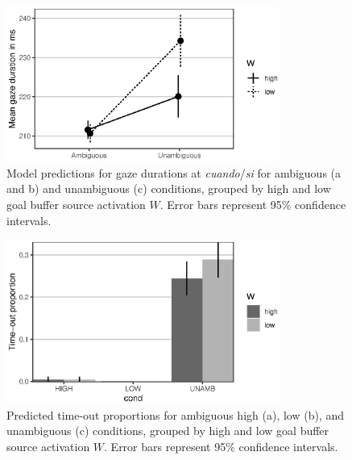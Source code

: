 \documentclass{cambridge7A}\usepackage[]{graphicx}\usepackage[]{color}
\newenvironment{knitrout}{}{} %
\begin{document}
\begin{figure}[!htbp]
\centering
\begin{knitrout}
\color{fgcolor}

{\centering \includegraphics[width=0.8\textwidth]{figures/fig-mv13modelambadv-1} 

}



\end{knitrout}
  \caption[Predicted gaze durations by source activation at ambiguous and unambiguous attachments.]{Model predictions for gaze durations at \textit{cuando}/\textit{si} for ambiguous (a and b) and unambiguous (c) conditions, grouped by high and low goal buffer source activation $W$. Error bars represent 95\% confidence intervals.} \label{fig:mv13model:rt}
\end{figure}


\begin{figure}[!htbp]
  \centering
\begin{knitrout}
\color{fgcolor}

{\centering \includegraphics[width=0.8\textwidth]{figures/fig-mv13modeltimeout-1} 

}



\end{knitrout}
  \caption[Predicted time-out proportions by source activation at ambiguous and unambiguous attachments.]{Predicted time-out proportions for ambiguous high (a), low (b), and unambiguous (c) conditions, grouped by high and low goal buffer source activation $W$. Error bars represent 95\% confidence intervals.} \label{fig:mv13model:timeout}
\end{figure}
\end{document}

